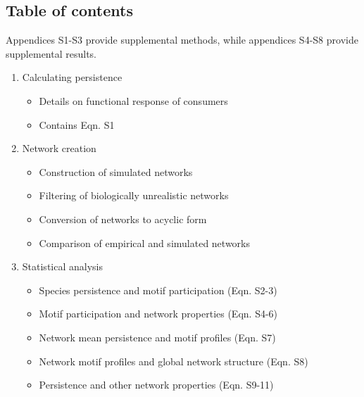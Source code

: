 \documentclass[12pt]{article}
\begin{document}
\setlength{\parindent}{15pt} 
\begin{spacing}{2.0}

\clearpage

\section*{Table of contents}
    {\footnotesize
    \begin{spacing}{1.0}

    Appendices S1-S3 provide supplemental methods, while appendices S4-S8 provide supplemental results.

    \begin{enumerate}
    
        \item Calculating persistence

            \begin{itemize}
                \item Details on functional response of consumers
                \item Contains Eqn. S1
            \end{itemize}    
            

        \item Network creation \\
        
            \begin{itemize}
            \item Construction of simulated networks
            \item Filtering of biologically unrealistic networks 
            \item Conversion of networks to acyclic form
            \item Comparison of empirical and simulated networks
            \end{itemize}
            
            
        \item Statistical analysis

            \begin{itemize}
                \item Species persistence and motif participation (Eqn. S2-3)
                \item Motif participation and network properties (Eqn. S4-6)
                \item Network mean persistence and motif profiles (Eqn. S7)
                \item Network motif profiles and global network structure (Eqn. S8)
                \item Persistence and other network properties (Eqn. S9-11)
            \end{itemize}
                


\end{enumerate}
\end{spacing}}
\end{spacing}
\end{document}
